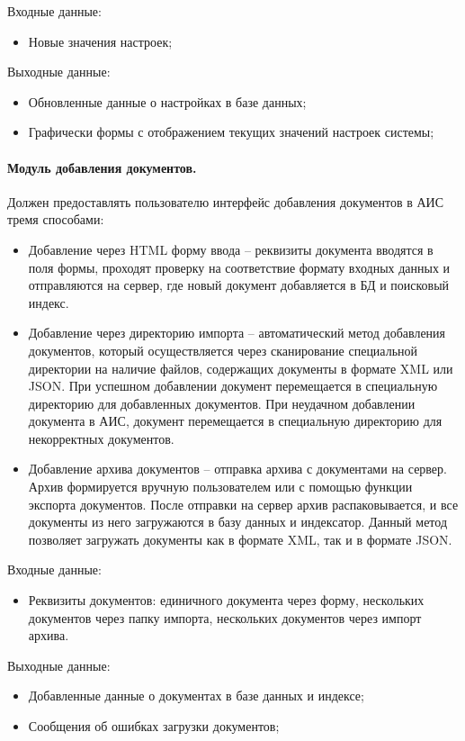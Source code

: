 Входные данные:
\begin{itemize}
\item Новые значения настроек;
\end{itemize}

Выходные данные:
\begin{itemize}
\item Обновленные данные о настройках в базе данных;
\item Графически формы с отображением текущих значений настроек системы;
\end{itemize}

\paragraph{Модуль добавления документов.}
Должен предоставлять пользователю интерфейс добавления документов в АИС тремя способами:
\begin{itemize}
\item Добавление через HTML форму ввода -- реквизиты документа вводятся в поля формы, проходят проверку на соответствие формату входных данных и отправляются на сервер, где новый документ добавляется в БД и поисковый индекс.
\item Добавление через директорию импорта -- автоматический метод добавления документов, который осуществляется через сканирование специальной директории на наличие файлов, содержащих документы в формате XML или JSON. При успешном добавлении документ перемещается в специальную директорию для добавленных документов. При неудачном добавлении документа в АИС, документ перемещается в специальную директорию для некорректных документов.
\item Добавление архива документов -- отправка архива с документами на сервер. Архив формируется вручную пользователем или с помощью функции экспорта документов. После отправки на сервер архив распаковывается, и все документы из него загружаются в базу данных и индексатор. Данный метод позволяет загружать документы как в формате XML, так и в формате JSON.
\end{itemize}

Входные данные:
\begin{itemize}
\item Реквизиты документов: единичного документа через форму, нескольких документов через папку импорта, нескольких документов через импорт архива.
\end{itemize}

Выходные данные:
\begin{itemize}
\item Добавленные данные о документах в базе данных и индексе;
\item Сообщения об ошибках загрузки документов;
\end{itemize}

